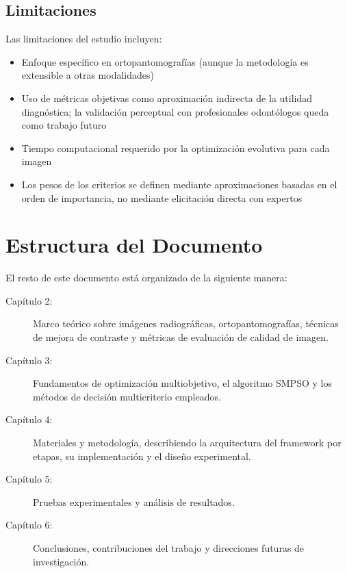 \subsection{Limitaciones}

Las limitaciones del estudio incluyen:
\begin{itemize}
    \item Enfoque específico en ortopantomografías (aunque la metodología es extensible a otras modalidades)
    \item Uso de métricas objetivas como aproximación indirecta de la utilidad diagnóstica; la validación perceptual con profesionales odontólogos queda como trabajo futuro
    \item Tiempo computacional requerido por la optimización evolutiva para cada imagen
    \item Los pesos de los criterios se definen mediante aproximaciones basadas en el orden de importancia, no mediante elicitación directa con expertos
\end{itemize}

\section{Estructura del Documento}

El resto de este documento está organizado de la siguiente manera:

\begin{description}
    \item[Capítulo 2:] Marco teórico sobre imágenes radiográficas, ortopantomografías, técnicas de mejora de contraste y métricas de evaluación de calidad de imagen.

    \item[Capítulo 3:] Fundamentos de optimización multiobjetivo, el algoritmo SMPSO y los métodos de decisión multicriterio empleados.

    \item[Capítulo 4:] Materiales y metodología, describiendo la arquitectura del framework por etapas, su implementación y el diseño experimental.

    \item[Capítulo 5:] Pruebas experimentales y análisis de resultados.

    \item[Capítulo 6:] Conclusiones, contribuciones del trabajo y direcciones futuras de investigación.
\end{description}
